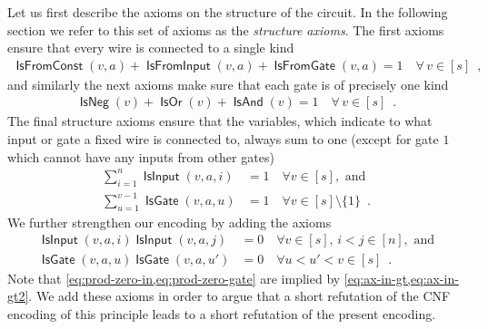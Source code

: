 \documentclass[10pt,a4paper]{article}
\theoremstyle{plain}
\theoremstyle{remark}
\theoremstyle{definition}
\newcommand{\eqcomma}{\enspace ,}
\newcommand{\eqperiod}{\enspace .}
\newcommand{\vars}[1]{\mathsf{#1}}
\DeclareMathOperator{\isneg}{\vars{IsNeg}}
\DeclareMathOperator{\isand}{\vars{IsAnd}}
\DeclareMathOperator{\isor}{\vars{IsOr}}
\DeclareMathOperator{\isfromconst}{\vars{IsFromConst}}
\DeclareMathOperator{\isfromvar}{\vars{IsFromInput}}
\DeclareMathOperator{\isfromgate}{\vars{IsFromGate}}
\DeclareMathOperator{\isvar}{\vars{IsInput}}
\DeclareMathOperator{\isgate}{\vars{IsGate}}
\begin{document}
Let us first describe
the axioms on the structure of the circuit. In the following
section we refer to this set of axioms as the \emph{structure
  axioms}. The first axioms ensure that every wire is connected to a
single kind
\begin{align}
  \label{eq:ax-from}
  \isfromconst(v, a) +
  \isfromvar(v, a) +
  \isfromgate(v, a) = 1 \quad
  \forall \, v \in [s] \eqcomma
\end{align}
and similarly the next axioms make sure that each gate is of
precisely one kind
\begin{align}
  \label{eq:ax-fn}
  \isneg(v) + \isor(v) + \isand(v) = 1
  \quad \forall \, v \in [s] \eqperiod
\end{align}
The final structure axioms ensure that the variables, which indicate
to what input or gate a fixed wire is connected to, always sum to one
(except for gate $1$ which cannot have any inputs from other gates)
\begin{align}
  \label{eq:ax-in-gt}
  \sum_{i = 1}^{n}\isvar(v,a,i) &= 1
  \quad \forall v \in [s], \text{ and}\\
  \label{eq:ax-in-gt2}
  \sum_{u = 1}^{v-1}\isgate(v,a,u) &= 1
  \quad \forall v \in [s] \setminus\{1\} \eqperiod
\end{align}
We further strengthen our encoding by adding the axioms
\begin{align}
  \label{eq:prod-zero-in}
  \isvar(v,a,i)\isvar(v,a,j) &= 0
  \quad\forall v \in [s],\, i < j \in [n], \text{ and}\\
  \label{eq:prod-zero-gate}
  \isgate(v,a,u)\isgate(v,a,u') &= 0
  \quad\forall u < u' < v \in [s] \eqperiod
\end{align}
Note that \cref{eq:prod-zero-in,eq:prod-zero-gate} are implied by
\cref{eq:ax-in-gt,eq:ax-in-gt2}. We add these axioms in order to argue
that a short refutation of the CNF encoding of this principle leads to
a short refutation of the present encoding.
\end{document}
